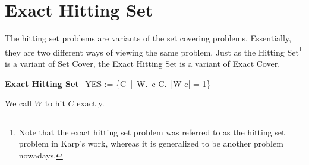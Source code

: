 \section{Exact Hitting Set}
The hitting set problems are variants of the set covering problems. Essentially, they are two different ways 
of viewing the same problem. Just as the Hitting Set\footnote{Note that the exact hitting set problem was referred to as the hitting set problem in Karp's work, whereas 
it is generalized to be another problem nowadays.} is a variant of Set Cover, the Exact Hitting Set is 
a variant of Exact Cover. 
\begin{myalign}
   \textbf{Exact Hitting Set}_{YES} := \{C\ |\ \exists W.\ \forall c \in C.\ |W \cap c| = 1\}
\end{myalign}
We call $W$ to hit $C$ exactly.
 

